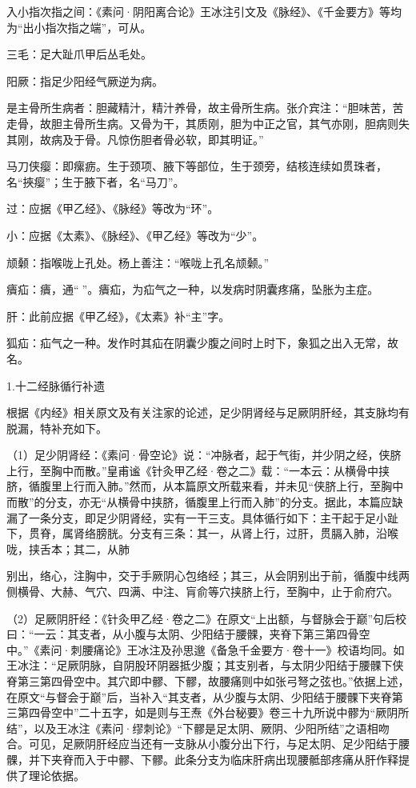 \documentclass[12pt]{ctexbook}%
\begin{document}

\begin{jiaozhu}
	\item 入小指次指之间：《素问·阴阳离合论》王冰注引文及《脉经》、《千金要方》等均为“出小指次指之端”，可从。
	\item 三毛：足大趾爪甲后丛毛处。
	\item 阳厥：指足少阳经气厥逆为病。
	\item 是主骨所生病者：胆藏精汁，精汁养骨，故主骨所生病。张介宾注：“胆味苦，苦走骨，故胆主骨所生病。又骨为干，其质刚，胆为中正之官，其气亦刚，胆病则失其刚，故病及于骨。凡惊伤胆者骨必软，即其明证。”
	\item 马刀侠瘿：即瘰疬。生于颈项、腋下等部位，生于颈旁，结核连续如贯珠者，名“挾瘿”；生于腋下者，名“马刀”。
	\item 过：应据《甲乙经》、《脉经》等改为“环”。
	\item 小：应据《太素》、《脉经》、《甲乙经》等改为“少”。
	\item 颃颡：指喉咙上孔处。杨上善注：“喉咙上孔名颃颡。”
	\item 㿉疝：㿉，通“𤻊”。㿉疝，为疝气之一种，以发病时阴囊疼痛，坠胀为主症。
	\item 肝：此前应据《甲乙经》，《太素》补“主”字。
	\item 狐疝：疝气之一种。发作时其疝在阴囊少腹之间时上时下，象狐之出入无常，故名。
\end{jiaozhu}


1.十二经脉循行补遗

根据《内经》相关原文及有关注家的论述，足少阴肾经与足厥阴肝经，其支脉均有脱漏，特补充如下。

（1）足少阴肾经：《素问·骨空论》说：“冲脉者，起于气街，并少阴之经，侠脐上行，至胸中而散。”皇甫谧《针灸甲乙经·卷之二》载：“一本云：从横骨中挟脐，循腹里上行而入肺。”然而，从本篇原文所载来看，并未见“侠脐上行，至胸中而散”的分支，亦无“从横骨中挟脐，循腹里上行而入肺”的分支。据此，本篇应缺漏了一条分支，即足少阴肾经，实有一干三支。具体循行如下：主干起于足小趾下，贯脊，属肾络膀胱。分支有三条：其一，从肾上行，过肝，贯膈入肺，沿喉咙，挟舌本；其二，从肺

别出，络心，注胸中，交于手厥阴心包络经；其三，从会阴别出于前，循腹中线两侧横骨、大赫、气穴、四满、中注、肓俞等穴挟脐上行，至胸中，止于俞府穴。

（2）足厥阴肝经：《针灸甲乙经·卷之二》在原文“上出额，与督脉会于巅”句后校曰：“一云：其支者，从小腹与太阴、少阳结于腰髁，夹脊下第三第四骨空中。”《素问·刺腰痛论》王冰注及孙思邈《备急千金要方·卷十一》校语均同。如王冰注：“足厥阴脉，自阴股环阴器抵少腹；其支别者，与太阴少阳结于腰髁下侠脊第三第四骨空中。其穴即中髎、下髎，故腰痛则中如张弓弩之弦也。”依据上述，在原文“与督会于巅”后，当补入“其支者，从少腹与太阴、少阳结于腰髁下夹脊第三第四骨空中”二十五字，如是则与王焘《外台秘要》卷三十九所说中髎为“厥阴所结”，以及王冰注《素问·缪刺论》“下髎是足太阴、厥阴、少阳所结”之语相吻合。可见，足厥阴肝经应当还有一支脉从小腹分出下行，与足太阴、足少阳结于腰髁，并下夹脊而入于中髎、下髎。此条分支为临床肝病出现腰骶部疼痛从肝作释提供了理论依据。
\end{document}
